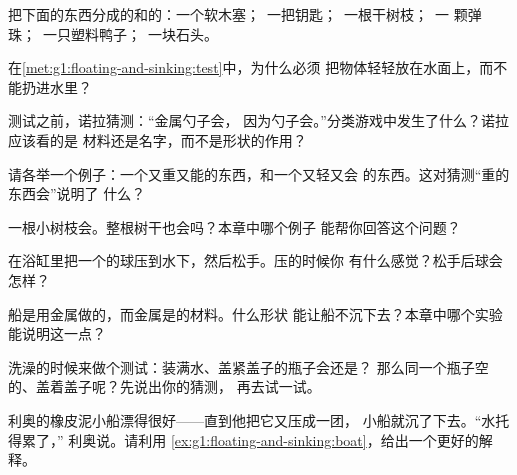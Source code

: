 \begin{exercise}[$\star$]\label{exo:g1:floating-and-sinking:1}
把下面的东西分成的和的：一个软木塞；\ 一把钥匙；\ 一根干树枝；\ 一
颗弹珠；\ 一只塑料鸭子；\ 一块石头。
\end{exercise}

\begin{exercise}[$\star$]\label{exo:g1:floating-and-sinking:2}
在\cref{met:g1:floating-and-sinking:test}中，为什么必须
把物体轻轻放在水面上，而不能扔进水里？
\end{exercise}

\begin{exercise}[$\star$]\label{exo:g1:floating-and-sinking:3}
测试之前，诺拉猜测：“金属勺子会，
因为勺子会。”分类游戏中发生了什么？诺拉应该看的是
材料还是名字，而不是形状的作用？
\end{exercise}

\begin{exercise}[$\star$]\label{exo:g1:floating-and-sinking:4}
请各举一个例子：一个又重又能的东西，和一个又轻又会
的东西。这对猜测“重的东西会”说明了
什么？
\end{exercise}

\begin{exercise}[$\star$]\label{exo:g1:floating-and-sinking:5}
一根小树枝会。整根树干也会吗？本章中哪个例子
能帮你回答这个问题？
\end{exercise}

\begin{exercise}[$\star$]\label{exo:g1:floating-and-sinking:6}
在浴缸里把一个的球压到水下，然后松手。压的时候你
有什么感觉？松手后球会怎样？
\end{exercise}

\begin{exercise}[$\star$]\label{exo:g1:floating-and-sinking:7}
船是用金属做的，而金属是的材料。什么形状
能让船不沉下去？本章中哪个实验能说明这一点？
\end{exercise}

\begin{exercise}[$\star$]\label{exo:g1:floating-and-sinking:8}
洗澡的时候来做个测试：装满水、盖紧盖子的瓶子会还是？
那么同一个瓶子空的、盖着盖子呢？先说出你的猜测，
再去试一试。
\end{exercise}

\begin{exercise}[$\star\star$]\label{exo:g1:floating-and-sinking:9}
利奥的橡皮泥小船漂得很好——直到他把它又压成一团，
小船就沉了下去。“水托得累了，”
利奥说。请利用
\cref{ex:g1:floating-and-sinking:boat}，给出一个更好的解释。
\end{exercise}
